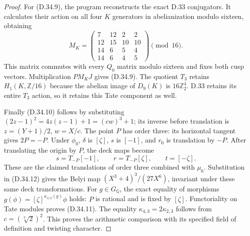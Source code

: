\begin{proof}
For (D.34.9), the program reconstructs the exact D.33 conjugators.
It calculates their action on all four $K$ generators in abelianization
modulo sixteen, obtaining
\[
 M_K=\begin{pmatrix}
 7&12&2&2\\12&15&10&10\\14&6&5&4\\14&6&4&5
 \end{pmatrix}\pmod {16}.
                                                               \tag{D.34.16}
\]
This matrix commutes with every $Q_0$ matrix modulo sixteen and fixes
both cusp vectors. Multiplication $P M_KJ$ gives (D.34.9).
The quotient $T_3$ retains $H_1(K,\mathbb Z/16)$ because the
abelian image of $D_9(K)$ is $16\mathbb Z_2^4$. D.33 retains its
entire $T_3$ action, so it retains this Tate component as well.

Finally (D.34.10) follows by substituting
$(2z-1)^2=4z(z-1)+1=(cw)^3+1$; its inverse before translation is
$z=(Y+1)/2$, $w=X/c$. The point $P$ has order three: its horizontal
tangent gives $2P=-P$. Under $\phi_0$, $\delta$ is $[\zeta]$,
$s$ is $[-1]$, and $r_0$ is translation by $-P$. After translating
the origin by $P$, the deck maps become
\[
       s=T_{-P}[-1],\qquad r=T_{-P}[\zeta],
       \qquad t=[-\zeta].                             \tag{D.34.17}
\]
These are the claimed translations of order three combined with
$\mu_6$. Substitution in (D.34.12) gives the Belyi map
$(X^3+4)^3/(27X^6)$, invariant under these same deck transformations.
For $g\in G_{\mathbb Q}$, the exact equality of morphisms
$g(\phi)=[\zeta]^{\kappa_{4,3}(g)}\phi$ holds: $P$ is rational and
is fixed by $[\zeta]$. Functoriality on Tate modules proves
(D.34.11). The equality $\kappa_{4,3}=2\kappa_{2,3}$ follows from
$c=(\sqrt[3]{2})^2$. This proves the arithmetic comparison with its
specified field of definition and twisting character.
\end{proof}
